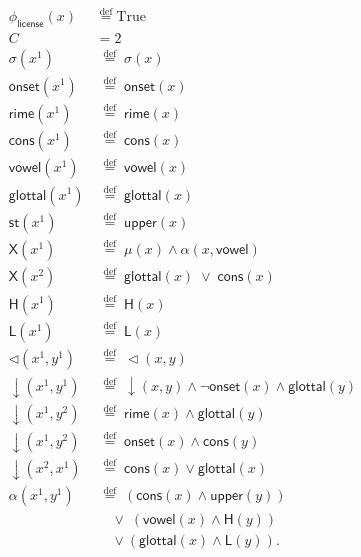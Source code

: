 \documentclass{article}
\newcommand{\defeq}{\stackrel{\mathrm{def}}{=}}
\begin{document}
\begin{align*}
\phi_{\textsf{license}}(x) &\;\defeq\; \text{True}\\
\textit{C} &= 2\\[6pt]
\sigma(x^1) &\;\defeq\; \sigma(x)\\
\mathsf{onset}(x^1) &\;\defeq\; \mathsf{onset}(x)\\
\mathsf{rime}(x^1) &\;\defeq\; \mathsf{rime}(x)\\
\mathsf{cons}(x^1) &\;\defeq\; \mathsf{cons}(x)\\
\mathsf{vowel}(x^1) &\;\defeq\; \mathsf{vowel}(x)\\
\mathsf{glottal}(x^1) &\;\defeq\; \mathsf{glottal}(x)\\
\mathsf{st}(x^1) &\;\defeq\; \mathsf{upper}(x)\\[6pt]
\mathsf{X}(x^1) &\;\defeq\; \mu(x) \wedge \alpha(x,\mathsf{vowel})\\
\mathsf{X}(x^2) &\;\defeq\; \mathsf{glottal}(x) \;\vee\; \mathsf{cons}(x)\\
\mathsf{H}(x^1) &\;\defeq\; \mathsf{H}(x)\\
\mathsf{L}(x^1) &\;\defeq\; \mathsf{L}(x)\\[6pt]
\lhd(x^1,y^1) &\;\defeq\; \lhd(x,y)\\
\downarrow(x^1,y^1) 
   &\;\defeq\; \downarrow(x,y) \wedge \lnot\mathsf{onset}(x) \wedge \mathsf{glottal}(y)\\
\downarrow(x^1,y^2) 
   &\;\defeq\; \mathsf{rime}(x) \wedge \mathsf{glottal}(y)\\
\downarrow(x^1,y^2) 
   &\;\defeq\; \mathsf{onset}(x) \wedge \mathsf{cons}(y)\\
\downarrow(x^2,x^1) 
   &\;\defeq\; \mathsf{cons}(x) \vee \mathsf{glottal}(x) \\[6pt]
\alpha(x^1,y^1) 
   &\;\defeq\; (\mathsf{cons}(x) \wedge \mathsf{upper}(y)) \\
   &\;\;\;\;\vee\; (\mathsf{vowel}(x) \wedge \mathsf{H}(y)) \\
   &\;\;\;\;\vee (\mathsf{glottal}(x) \wedge\mathsf{L}(y)).
\end{align*}
\end{document}
